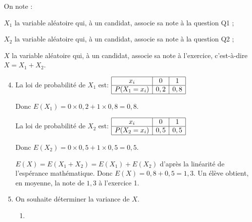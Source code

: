 \begin{list}{\textbullet}{On note :}
		\item $X_{1}$ la variable aléatoire qui, à un candidat, associe sa note à la question Q1 ;
		\item $X_{2}$ la variable aléatoire qui, à un candidat, associe sa note à la question Q2 ;
		\item $X$ la variable aléatoire qui, à un candidat, associe sa note à l'exercice, c'est-à-dire $X = X_{1} + X_{2}$.
\end{list}

\begin{enumerate}
\setcounter{enumi}{3}

\item La loi de probabilité de $X_1$ est:\hspace{2cm}
$\begin{array}{|c|c|c|}
\hline
x_i & 0 & 1\\
\hline
P(X_1=x_i) & 0,2 & 0,8\\
\hline
\end{array}$

Donc $E(X_1)= 0\times 0,2 + 1\times 0,8=0,8$.

La loi de probabilité de $X_2$ est:\hspace{2cm}
$\begin{array}{|c|c|c|}
\hline
x_i & 0 & 1\\
\hline
P(X_2=x_i) & 0,5 & 0,5\\
\hline
\end{array}$

Donc $E(X_2)= 0\times 0,5 + 1\times 0,5 =0,5$.

$E(X)=E(X_1+X_2)=E(X_1)+E(X_2)$ d'après la linéarité de l'espérance mathématique.
Donc $E(X)=0,8+0,5=1,3$. Un élève obtient, en moyenne, la note de $1,3$ à l'exercice 1.

\item On souhaite déterminer la variance de $X$.

	\begin{enumerate}
		\item %


\end{enumerate}
\end{enumerate}

